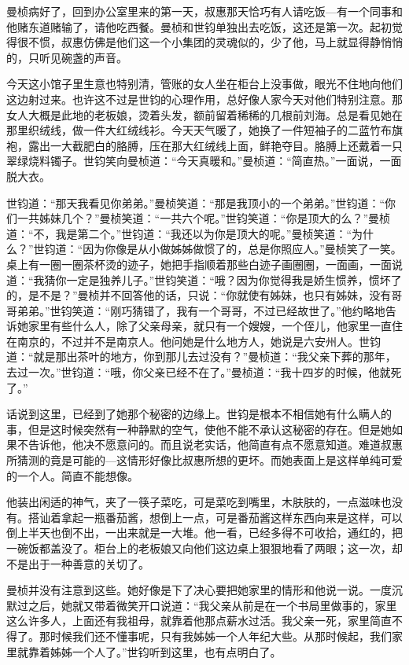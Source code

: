 \par 曼桢病好了，回到办公室里来的第一天，叔惠那天恰巧有人请吃饭—有一个同事和他赌东道赌输了，请他吃西餐。曼桢和世钧单独出去吃饭，这还是第一次。起初觉得很不惯，叔惠仿佛是他们这一个小集团的灵魂似的，少了他，马上就显得静悄悄的，只听见碗盏的声音。
\par 今天这小馆子里生意也特别清，管账的女人坐在柜台上没事做，眼光不住地向他们这边射过来。也许这不过是世钧的心理作用，总好像人家今天对他们特别注意。那女人大概是此地的老板娘，烫着头发，额前留着稀稀的几根前刘海。总是看见她在那里织绒线，做一件大红绒线衫。今天天气暖了，她换了一件短袖子的二蓝竹布旗袍，露出一大截肥白的胳膊，压在那大红绒线上面，鲜艳夺目。胳膊上还戴着一只翠绿烧料镯子。世钧笑向曼桢道：“今天真暖和。”曼桢道：“简直热。”一面说，一面脱大衣。
\par 世钧道：“那天我看见你弟弟。”曼桢笑道：“那是我顶小的一个弟弟。”世钧道：“你们一共姊妹几个？”曼桢笑道：“一共六个呢。”世钧笑道：“你是顶大的么？”曼桢道：“不，我是第二个。”世钧道：“我还以为你是顶大的呢。”曼桢笑道：“为什么？”世钧道：“因为你像是从小做姊姊做惯了的，总是你照应人。”曼桢笑了一笑。桌上有一圈一圈茶杯烫的迹子，她把手指顺着那些白迹子画圈圈，一面画，一面说道：“我猜你一定是独养儿子。”世钧笑道：“哦？因为你觉得我是娇生惯养，惯坏了的，是不是？”曼桢并不回答他的话，只说：“你就使有姊妹，也只有姊妹，没有哥哥弟弟。”世钧笑道：“刚巧猜错了，我有一个哥哥，不过已经故世了。”他约略地告诉她家里有些什么人，除了父亲母亲，就只有一个嫂嫂，一个侄儿，他家里一直住在南京的，不过并不是南京人。他问她是什么地方人，她说是六安州人。世钧道：“就是那出茶叶的地方，你到那儿去过没有？”曼桢道：“我父亲下葬的那年，去过一次。”世钧道：“哦，你父亲已经不在了。”曼桢道：“我十四岁的时候，他就死了。”
\par 话说到这里，已经到了她那个秘密的边缘上。世钧是根本不相信她有什么瞒人的事，但是这时候突然有一种静默的空气，使他不能不承认这秘密的存在。但是她如果不告诉他，他决不愿意问的。而且说老实话，他简直有点不愿意知道。难道叔惠所猜测的竟是可能的—这情形好像比叔惠所想的更坏。而她表面上是这样单纯可爱的一个人。简直不能想像。
\par 他装出闲适的神气，夹了一筷子菜吃，可是菜吃到嘴里，木肤肤的，一点滋味也没有。搭讪着拿起一瓶番茄酱，想倒上一点，可是番茄酱这样东西向来是这样，可以倒上半天也倒不出，一出来就是一大堆。他一看，已经多得不可收拾，通红的，把一碗饭都盖没了。柜台上的老板娘又向他们这边桌上狠狠地看了两眼；这一次，却不是出于一种善意的关切了。
\par 曼桢并没有注意到这些。她好像是下了决心要把她家里的情形和他说一说。一度沉默过之后，她就又带着微笑开口说道：“我父亲从前是在一个书局里做事的，家里这么许多人，上面还有我祖母，就靠着他那点薪水过活。我父亲一死，家里简直不得了。那时候我们还不懂事呢，只有我姊姊一个人年纪大些。从那时候起，我们家里就靠着姊姊一个人了。”世钧听到这里，也有点明白了。
